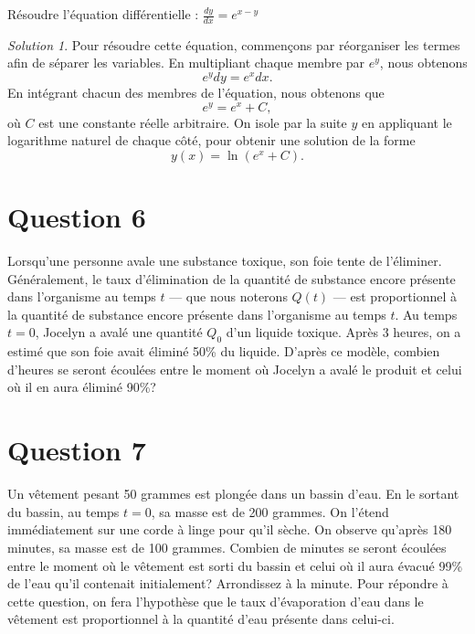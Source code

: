 \documentclass[
  12pt,
  letterpaper,
]{book}
\theoremstyle{remark}
\newtheorem*{solution}{Solution}
\begin{document}
Résoudre l'équation différentielle : \(\frac{dy}{dx} = e^{x-y}\)

\begin{solution}

Pour résoudre cette équation, commençons par réorganiser les termes afin
de séparer les variables. En multipliant chaque membre par \(e^y\), nous
obtenons \[e^y dy = e^x dx.\] En intégrant chacun des membres de
l'équation, nous obtenons que \[e^y = e^x + C,\] où \(C\) est une
constante réelle arbitraire. On isole par la suite \(y\) en appliquant
le logarithme naturel de chaque côté, pour obtenir une solution de la
forme \[y(x) = \ln(e^x + C).\]

\end{solution}

\hypertarget{question-6-4}{%
\section{Question 6}\label{question-6-4}}

Lorsqu'une personne avale une substance toxique, son foie tente de
l'éliminer. Généralement, le taux d'élimination de la quantité de
substance encore présente dans l'organisme au temps \(t\) --- que nous
noterons \(Q(t)\) --- est proportionnel à la quantité de substance
encore présente dans l'organisme au temps \(t\). Au temps \(t=0\),
Jocelyn a avalé une quantité \(Q_0\) d'un liquide toxique. Après 3
heures, on a estimé que son foie avait éliminé 50\% du liquide. D'après
ce modèle, combien d'heures se seront écoulées entre le moment où
Jocelyn a avalé le produit et celui où il en aura éliminé 90\%?

\hypertarget{question-7-2}{%
\section{Question 7}\label{question-7-2}}

Un vêtement pesant 50 grammes est plongée dans un bassin d'eau. En le
sortant du bassin, au temps \(t=0\), sa masse est de 200 grammes. On
l'étend immédiatement sur une corde à linge pour qu'il sèche. On observe
qu'après 180 minutes, sa masse est de 100 grammes. Combien de minutes se
seront écoulées entre le moment où le vêtement est sorti du bassin et
celui où il aura évacué 99\% de l'eau qu'il contenait initialement?
Arrondissez à la minute. Pour répondre à cette question, on fera
l'hypothèse que le taux d'évaporation d'eau dans le vêtement est
proportionnel à la quantité d'eau présente dans celui-ci.
\end{document}

